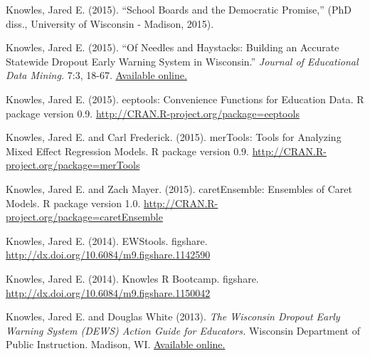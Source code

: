 \documentclass[margin,line]{res}
\begin{document}
\begin{resume}
Knowles, Jared E. (2015). ``School Boards and the Democratic Promise,'' (PhD diss., University of 
Wisconsin - Madison, 2015).

Knowles, Jared E. (2015). ``Of Needles and Haystacks: Building an Accurate Statewide 
Dropout Early Warning System in Wisconsin.'' \emph{Journal of Educational Data 
Mining.} 7:3, 18-67. 
\href{http://www.educationaldatamining.org/JEDM/index.php/JEDM/article/view/JEDM082}{Available online.}

Knowles, Jared E. (2015). eeptools: Convenience Functions for Education Data. R package
  version 0.9. \url{http://CRAN.R-project.org/package=eeptools}

Knowles, Jared E. and Carl Frederick. (2015). merTools: Tools for Analyzing Mixed 
Effect Regression Models. R package version 0.9. 
\url{http://CRAN.R-project.org/package=merTools}

Knowles, Jared E. and Zach Mayer. (2015). caretEnsemble: Ensembles of Caret Models. 
R package version 1.0. \url{http://CRAN.R-project.org/package=caretEnsemble}

Knowles, Jared E. (2014). EWStools. figshare. \url{http://dx.doi.org/10.6084/m9.figshare.1142590}

Knowles, Jared E. (2014). Knowles R Bootcamp. figshare. 
\url{http://dx.doi.org/10.6084/m9.figshare.1150042}

Knowles, Jared E. and Douglas White (2013). \emph{The Wisconsin Dropout Early 
Warning System (DEWS) Action Guide for Educators.} Wisconsin Department of Public 
Instruction. Madison, WI. \href{http://dpi.wi.gov/dews}{Available online.}



% 
% 



\end{resume}
\end{document}
